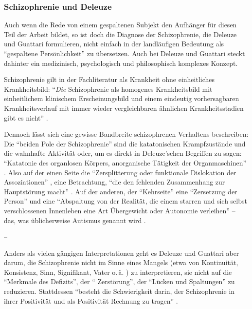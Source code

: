 \documentclass[12pt,
               DIV13,
               paper=a4,
               twoside=false,
               onehalfspacing,
               bibliography=totoc,
               toc=graduated,
               draft,
               ]{scrartcl}
\newcommand{\pc}[2]{\parencite[#1]{#2}}
\newcommand{\vgl}[2]{\parencite[vgl.][#1]{#2}}
\begin{document}
\subsubsection{Schizophrenie und Deleuze}

Auch wenn die Rede von einem gespaltenen Subjekt den Aufhänger für
diesen Teil der Arbeit bildet, so ist doch die Diagnose der
Schizophrenie, die Deleuze und Guattari formulieren, nicht einfach in
der landläufigen Bedeutung als "`gespaltene Persönlichkeit"' zu
übersetzen. Auch bei Deleuze und Guattari steckt dahinter ein
medizinisch, psychologisch und philosophisch komplexes Konzept.

Schizophrenie gilt in der Fachliteratur als Krankheit ohne
einheitliches Krankheitsbild: "`\emph{Die} Schizophrenie als homogenes
Krankheitsbild mit einheitlichem klinischem Erscheinungsbild und einem
eindeutig vorhersagbaren Krankheitsverlauf mit immer wieder
vergleichbaren ähnlichen Krankheitsstadien gibt es nicht"'
\pc{799}{psych}.

Dennoch lässt sich eine gewisse Bandbreite schizophrenen Verhaltens
beschreiben: Die "`beiden Pole der Schizophrenie"' \pc{21}{schizg}
sind die katatonischen Krampfzustände und die wahnhafte Aktivität
oder, um es direkt in Deleuze'schen Begriffen zu sagen: "`Katatonie
des organlosen Körpers, anorganische Tätigkeit der Organmaschinen"'
\pc{21}{schizg}. Also auf der einen Seite die "`Zersplitterung oder
funktionale Dislokation der Assoziationen"' \pc{23}{schizg}, eine
Betrachtung, "`die den fehlenden Zusammenhang zur Hauptstörung macht"'
\pc{23}{schizg}. Auf der anderen, der "`Kehrseite"' eine "`Zersetzung
der Person"' und eine "`Abspaltung von der Realität, die einem
starren und sich selbst verschlossenen Innenleben eine Art Übergewicht
oder Autonomie verleihen"' \pc{23}{schizg} -- das, was üblicherweise
Autismus genannt wird \vgl{801}{psych}.

--

Anders als vielen gängigen Interpretationen geht es Deleuze und
Guattari aber darum, die Schizophrenie nicht im Sinne eines Mangels
(etwa von Kontinuität, Konsistenz, Sinn, Signifikant, Vater o.\,ä.
\vgl{xx}{schizg}) zu interpretieren, sie nicht auf die "`Merkmale des
Defizits"', der "` Zerstörung"', der "`Lücken und Spaltungen"'
\pc{24}{schizg} zu reduzieren. Stattdessen "`besteht die Schwierigkeit
darin, der Schizophrenie in ihrer Positivität und als Positivität
Rechnung zu tragen"' \pc{24}{schizg}.
\end{document}
